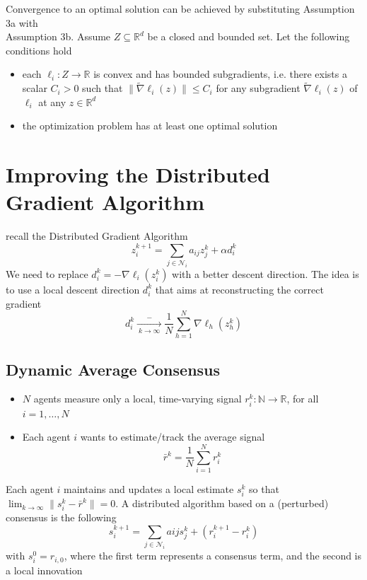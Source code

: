 \documentclass{book}
\newcommand{\R}{\mathbb{R}}
\newcommand{\N}{\mathbb{N}}
\theoremstyle{theoremv2}
\theoremstyle{defv2}
\theoremstyle{remark}
\theoremstyle{remark}
\theoremstyle{definition}
\theoremstyle{definition}
\begin{document}
Convergence to an optimal solution can be achieved by substituting Assumption 3a with 
\\Assumption 3b. Assume $Z\subseteq \R^d$ be a closed and bounded set. Let the following conditions hold 
\begin{itemize}
    \item each $\ell_i:Z\to\R$ is convex and has bounded subgradients, i.e. there exists a scalar $C_i>0$ such that $\|\tilde\nabla\ell_i(z)\|\leq C_i$ for any subgradient $\tilde\nabla\ell_i(z)$ of $\ell_i$ at any $z\in\R^d$
        \item the optimization problem has at least one optimal solution
\end{itemize}

\section{Improving the Distributed Gradient Algorithm}
recall the Distributed Gradient Algorithm 
\[
    z_i^{k+1} = \displaystyle\sum_{j\in\mathcal{N}_i}a_{ij}z_j^k + \alpha d_i^k
\]
We need to replace $d_i^k = -\nabla \ell_i(z_i^k)$ with a better descent direction. The idea is to use a local descent direction $d_i^k$ that aims at reconstructing the correct gradient
\[
    d_i^k \xrightarrow[\ k\to\infty\ ]-\displaystyle\frac{1}{N} \displaystyle\sum_{h=1}^{N}\nabla\ell_h(z_h^k)
\]

\subsection{Dynamic Average Consensus}
\begin{itemize}
    \item $N$ agents measure only a local, time-varying signal $r_i^k:\N\to\R$, for all $i=1,\dots,N$
    \item Each agent $i$ wants to estimate/track the average signal
        \[
            \bar{r}^k = \displaystyle\frac{1}{N} \displaystyle\sum_{i=1}^{N}r_i^k
        \]
\end{itemize}
Each agent $i$ maintains and updates a local estimate $s_i^k$ so that $\lim_{k\to\infty}\|s_i^k-\bar{r}^k\|=0$. A distributed algorithm based on a (perturbed) consensus is the following 
\[
    s_i^{k+1} = \displaystyle\sum_{j\in\mathcal{N}_i} a{ij} s_j^k + \left(r_i^{k+1}-r_i^k\right)
\]
with $s_i^0 = r_{i,0}$, where the first term represents a consensus term, and the second is a local innovation
\end{document}
